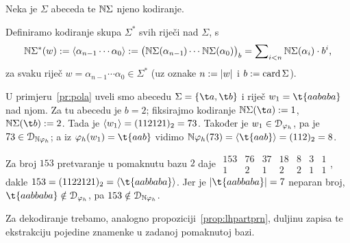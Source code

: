 \begin{definicija}[{name=[kodiranje riječi]}]
Neka je $\Sigma$ abeceda te ${\mathbb N}\Sigma$ njeno kodiranje.

	Definiramo kodiranje skupa $\Sigma^*$ svih riječi nad $\Sigma$, s
\begin{equation}\label{eq:kodNSz}
	{\mathbb N}\Sigma^*(w):=\langle\alpha_{n-1}\dotsm\alpha_0\rangle:=\bigl({\mathbb N}\Sigma(\alpha_{n-1}\mspace{-1mu})\dotsm\mspace{1mu}{\mathbb N}\Sigma(\alpha_0)\bigr)_{b}=\sum\nolimits_{i<n}{\mathbb N}\Sigma(\alpha_i)\cdot b^i\text,
\end{equation}
za svaku riječ $w=\alpha_{n-1}\dotsm\alpha_0\in\Sigma^*$ (uz oznake $n:=\lvert w\rvert$ i $b:=\operatorname{card}\Sigma$).
\end{definicija}

\begin{primjer}[{name=[prateća funkcija jezične funkcije]}]
U primjeru~\ref{pr:pola} uveli smo abecedu $\Sigma=\{\t a,\t b\}$ i riječ $w_1=\t{aababa}$ nad njom. Za tu abecedu je $b=2$; fiksirajmo kodiranje $\N\Sigma(\t a):=1$, $\N\Sigma(\t b):=2$. Tada je $\langle w_1\rangle=(112121)_2=73$.
Također je $w_1\in\mathcal D_{\varphi_h}$, pa je $73\in\mathcal D_{{\mathbb N}\varphi_h}$; a iz $\varphi_h(w_1)=\t{aab}$ vidimo $\N\varphi_h(73)=\kr{\t{aab}}=(112)_2=8$.

Za broj $153$ pretvaranje u pomaknutu bazu $2$ daje
	$\begin{smallmatrix}
153 & 76 & 37 & 18 & 8 & 3 & 1\\
1 & 2 & 1 & 2 & 2 & 1 & 1
\end{smallmatrix}$, dakle $153=(1122121)_2=\kr{\t{aabbaba}}$. Jer je $\dulj{\t{aabbaba}}=7$ neparan broj, $\t{aabbaba}\notin\dom{\varphi_h}$, pa $153\notin\mathcal D_{{\mathbb N}\varphi_h}$.
\end{primjer}

Za dekodiranje trebamo, analogno propoziciji~\ref{prop:lhpartprn}, duljinu zapisa te ekstrakciju pojedine znamenke u zadanoj pomaknutoj bazi. %

